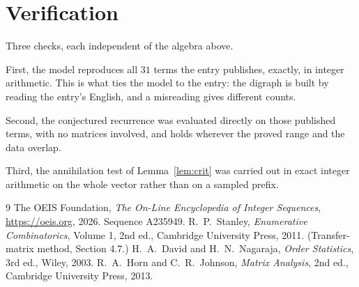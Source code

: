 \documentclass[11pt,a4paper]{article}
\theoremstyle{plain}
\theoremstyle{definition}
\begin{document}
\section{Verification}

Three checks, each independent of the algebra above.

First, the model reproduces all $31$ terms the entry publishes, exactly, in integer
arithmetic. This is what ties the model to the entry: the digraph is built by reading the
entry's English, and a misreading gives different counts.

Second, the conjectured recurrence was evaluated directly on those published terms, with no
matrices involved, and holds wherever the proved range and the data overlap.

Third, the annihilation test of Lemma~\ref{lem:crit} was carried out in exact integer
arithmetic on the whole vector rather than on a sampled prefix.

\begin{thebibliography}{9}
 The OEIS Foundation, \emph{The On-Line Encyclopedia of Integer
Sequences}, \url{https://oeis.org}, 2026. Sequence A235949.
 R.~P.~Stanley, \emph{Enumerative Combinatorics}, Volume 1, 2nd ed.,
Cambridge University Press, 2011. (Transfer-matrix method, Section 4.7.)
 H.~A.~David and H.~N.~Nagaraja, \emph{Order Statistics}, 3rd ed., Wiley,
2003.
 R.~A.~Horn and C.~R.~Johnson, \emph{Matrix Analysis}, 2nd ed., Cambridge
University Press, 2013.
\end{thebibliography}
\end{document}
